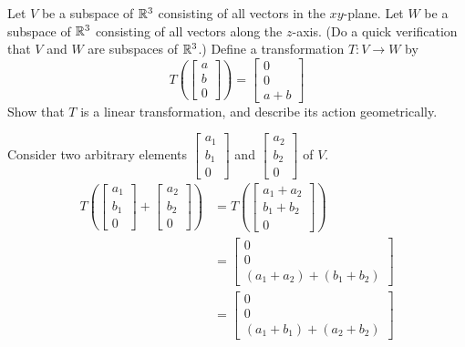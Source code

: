 \documentclass{ximera}
\begin{document}
\begin{example}\label{ex:subspacetransex1}
Let $V$ be a subspace of $\mathbb{R}^3$ consisting of all vectors in the $xy$-plane.  Let $W$ be a subspace of $\mathbb{R}^3$ consisting of all vectors along the $z$-axis.  (Do a quick verification that $V$ and $W$ are subspaces of $\mathbb{R}^3$.)  Define a transformation $T:V\rightarrow W$ by 
$$T\left(\begin{bmatrix}a\\b\\0\end{bmatrix}\right)=\begin{bmatrix}0\\0\\a+b\end{bmatrix}$$
Show that $T$ is a linear transformation, and describe its action geometrically.
\begin{explanation}
Consider two arbitrary elements $\begin{bmatrix}a_1\\b_1\\0\end{bmatrix}$ and $\begin{bmatrix}a_2\\b_2\\0\end{bmatrix}$ of $V$.
\begin{align*}
T\left(\begin{bmatrix}a_1\\b_1\\0\end{bmatrix}+ \begin{bmatrix}a_2\\b_2\\0\end{bmatrix}\right)&=T\left(\begin{bmatrix}a_1+a_2\\b_1+b_2\\0\end{bmatrix}\right)\\
&=\begin{bmatrix}0\\0\\(a_1+a_2)+(b_1+b_2)\end{bmatrix}\\
&=\begin{bmatrix}0\\0\\(a_1+b_1)+(a_2+b_2)\end{bmatrix}\\

\end{align*}
\end{explanation}
\end{example}
\end{document}

